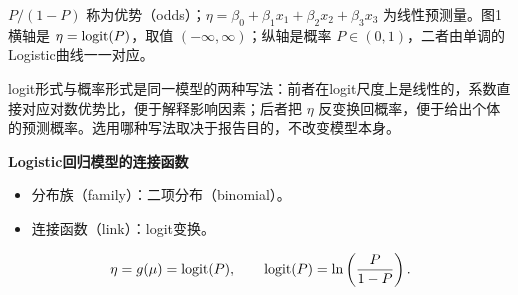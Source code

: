 \begin{annotation}
$P/(1-P)$ 称为优势（odds）；$\eta=\beta_0+\beta_1x_1+\beta_2x_2+\beta_3x_3$ 为线性预测量。图1横轴是 $\eta=\operatorname{logit}(P)$，取值 $(-\infty,\infty)$；纵轴是概率 $P\in(0,1)$，二者由单调的Logistic曲线一一对应。

logit形式与概率形式是同一模型的两种写法：前者在logit尺度上是线性的，系数直接对应对数优势比，便于解释影响因素；后者把 $\eta$ 反变换回概率，便于给出个体的预测概率。选用哪种写法取决于报告目的，不改变模型本身。
\end{annotation}
\textbf{Logistic回归模型的连接函数}
\begin{itemize}
\item 分布族（family）：二项分布（binomial）。
\item 连接函数（link）：logit变换。
\end{itemize}
\[
\eta=g(\mu)=\operatorname{logit}(P),\qquad \operatorname{logit}(P)=\ln\left(\frac{P}{1-P}\right).
\]
